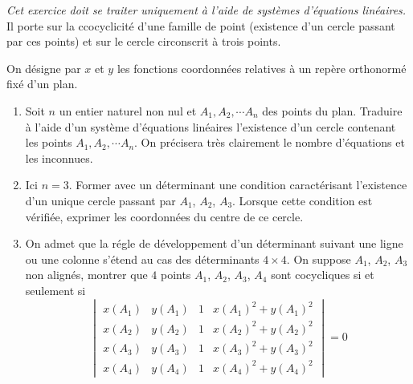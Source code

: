 \textit{Cet exercice doit se traiter uniquement à l'aide de systèmes d'équations linéaires.}\newline
Il porte sur la ccocyclicité d'une famille de point (existence d'un cercle passant par ces points) et sur le cercle circonscrit à trois points.

On désigne par $x$ et $y$ les fonctions coordonnées relatives à un repère orthonormé fixé d'un plan. 
\begin{enumerate}
 \item Soit $n$ un entier naturel non nul et $A_1,A_2,\cdots A_n$ des points du plan. Traduire à l'aide d'un système d'équations linéaires l'existence d'un cercle contenant les points $A_1,A_2,\cdots A_n$. On précisera très clairement le nombre d'équations et les inconnues.

 \item Ici $n=3$. Former avec un déterminant une condition caractérisant l'existence d'un unique cercle passant par $A_1$, $A_2$, $A_3$. Lorsque cette condition est vérifiée, exprimer les coordonnées du centre de ce cercle.
 \item On admet que la régle de développement d'un déterminant suivant une ligne ou une colonne s'étend au cas des déterminants $4\times 4$. On suppose $A_1$, $A_2$, $A_3$ non alignés, montrer que $4$ points $A_1$, $A_2$, $A_3$, $A_4$ sont cocycliques si et seulement si
\begin{displaymath}
 \begin{vmatrix}
  x(A_1) & y(A_1) & 1 & x(A_1)^2+y(A_1)^2 \\
  x(A_2) & y(A_2) & 1 & x(A_2)^2+y(A_2)^2 \\
  x(A_3) & y(A_3) & 1 & x(A_3)^2+y(A_3)^2 \\
  x(A_4) & y(A_4) & 1 & x(A_4)^2+y(A_4)^2 
 \end{vmatrix}
= 0
\end{displaymath}
  
\end{enumerate}


